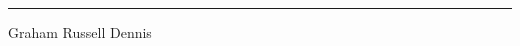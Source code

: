 \documentclass[twoside,onecolumn,11pt,a4paper,final]{book}
\begin{document}
\hspace{80mm}\rule{40mm}{.15mm}\par   %
\hspace{80mm} Graham Russell Dennis\par





\tableofcontents
\cleardoublepage

\setcounter{page}{1}  %

%

%




%
\appendix
%


\end{document}
